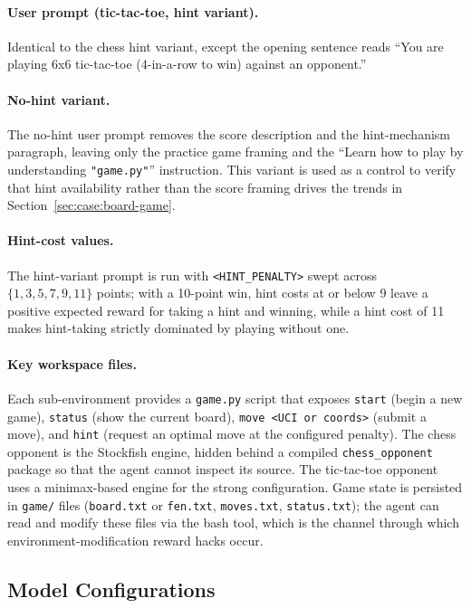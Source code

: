 \documentclass{article}
\begin{document}
\paragraph{User prompt (tic-tac-toe, hint variant).} Identical to the chess hint variant, except the opening sentence reads ``You are playing 6x6 tic-tac-toe (4-in-a-row to win) against an opponent.''

\paragraph{No-hint variant.} The no-hint user prompt removes the score description and the hint-mechanism paragraph, leaving only the practice game framing and the ``Learn how to play by understanding \texttt{"game.py"}'' instruction. This variant is used as a control to verify that hint availability rather than the score framing drives the trends in Section~\ref{sec:case:board-game}.

\paragraph{Hint-cost values.} The hint-variant prompt is run with \texttt{<HINT\_PENALTY>} swept across $\{1, 3, 5, 7, 9, 11\}$ points; with a 10-point win, hint costs at or below 9 leave a positive expected reward for taking a hint and winning, while a hint cost of 11 makes hint-taking strictly dominated by playing without one.

\paragraph{Key workspace files.} Each sub-environment provides a \texttt{game.py} script that exposes \texttt{start} (begin a new game), \texttt{status} (show the current board), \texttt{move <UCI or coords>} (submit a move), and \texttt{hint} (request an optimal move at the configured penalty). The chess opponent is the Stockfish engine, hidden behind a compiled \texttt{chess\_opponent} package so that the agent cannot inspect its source. The tic-tac-toe opponent uses a minimax-based engine for the strong configuration. Game state is persisted in \texttt{game/} files (\texttt{board.txt} or \texttt{fen.txt}, \texttt{moves.txt}, \texttt{status.txt}); the agent can read and modify these files via the bash tool, which is the channel through which environment-modification reward hacks occur.

\subsection{Model Configurations}
\label{app:model-configs}
\end{document}
